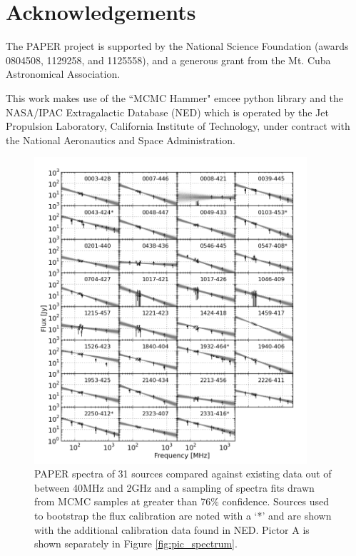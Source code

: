 \documentclass[preprint]{aastex}
\begin{document}
\section*{Acknowledgements}

The PAPER project is supported by the National Science Foundation (awards
0804508, 1129258, and 1125558), and a generous grant from the Mt. Cuba
Astronomical Association.

This work makes use of the ``MCMC Hammer" emcee python library \citep[
\url{http://danfm.ca/emcee/}]{ForemanMackey:2012p8684}  and the NASA/IPAC
Extragalactic Database (NED) which is operated by the Jet Propulsion
Laboratory, California Institute of Technology, under contract with the
National Aeronautics and Space Administration.



\begin{figure}[htbp]
\begin{center}
\includegraphics[width=0.9\textwidth]{plots/srcfig_1.png}
\end{center}
\caption{
PAPER spectra of 31 sources compared against existing data out of
\cite{Vollmer:2010p6422} between 40MHz and 2GHz and a sampling
of spectra fits drawn from MCMC samples at greater than 76\% confidence. Sources used to bootstrap the
flux calibration are noted with a `*' and are shown with the additional calibration data
found in NED. Pictor A is shown separately in Figure \ref{fig:pic_spectrum}.
\label{fig:srcs1}}
\end{figure}
\end{document}
